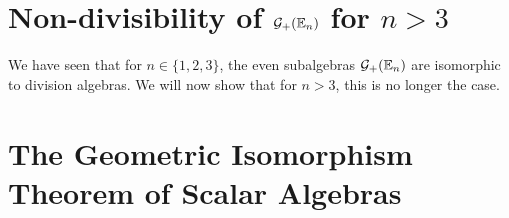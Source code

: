

\newpage

\section{Non-divisibility of $\mathcal{G}_+(\mathbb{E}_n)$ for $n > 3$}

We have seen that for $n \in \{1, 2, 3\}$, the even subalgebras $\mathcal{G}_+(\mathbb{E}_n)$ are isomorphic to division algebras. We will now show that for $n > 3$, this is no longer the case.

%

\newpage

\section{The Geometric Isomorphism Theorem of Scalar Algebras}

